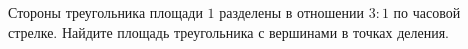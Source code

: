 \begin{ex}
	\begin{condition}
		Стороны треугольника площади \( 1  \) разделены в отношении \( 3 : 1  \) по часовой стрелке. Найдите площадь треугольника с вершинами в точках деления.
	\end{condition}
\end{ex}